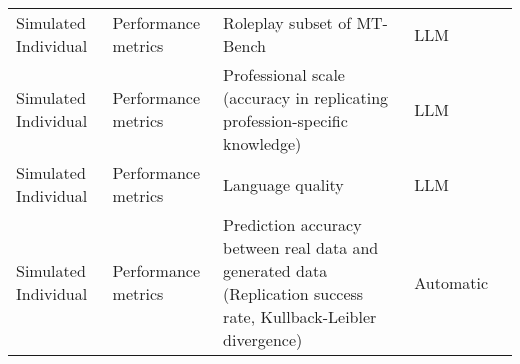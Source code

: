 \begin{small}
\begin{center}
\begin{longtable}{@{}p{}p{}p{}p{}p{}@{}}
Simulated Individual     & Performance metrics                 & Roleplay subset of MT-Bench                                                                                                                                                                                 & LLM       & \cite{tang2024erabalenhancingroleplayingagents}                                                                                                                                                                                                                                                                                                                                                                                              \\
Simulated Individual     & Performance metrics                 & Professional scale (accuracy in replicating profession-specific knowledge)                                                                                                                                  & LLM       & \cite{sun2024identitydrivenhierarchicalroleplayingagents}                                                                                                                                                                                                                                                                                                                                                                                           \\
Simulated Individual     & Performance metrics                 & Language quality                                                                                                                                                                                            & LLM       & \cite{Zhang2024SpeechAgentsHS}                                                                                                                                                                                                                                                                                                                                                                                                   \\
Simulated Individual     & Performance metrics                 & Prediction accuracy between real data and generated data (Replication success rate, Kullback-Leibler divergence)                                                                                            & Automatic & \cite{assaf2024human}                                                                                                                                                                                                                                                                                                                                                                     \\

\end{longtable}
\end{center}
\end{small}
